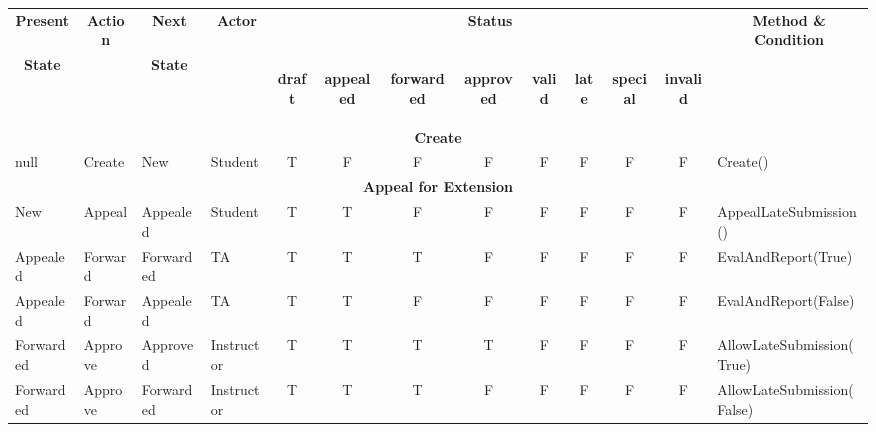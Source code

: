\documentclass{article}
\begin{document}
\begin{enumerate}
\begin{center}
\begin{scriptsize}
\begin{tabular}{|l|l|l|l|c|c|c|c|c|c|c|c|p{4cm}|} \hline
\multicolumn{1}{|c}{\bf Present} &
\multicolumn{1}{|c}{\bf Action} &
\multicolumn{1}{|c}{\bf Next} &
\multicolumn{1}{|c}{\bf Actor} &
\multicolumn{8}{|c}{\bf Status} &
\multicolumn{1}{|c|}{\bf Method \& Condition} \\ \cline{5-12}
\multicolumn{1}{|c}{\bf State} &
\multicolumn{1}{|c}{\bf } &
\multicolumn{1}{|c}{\bf State} &
\multicolumn{1}{|c}{\bf } &
\multicolumn{1}{|c}{\begin{sideways}{\bf draft \quad}\end{sideways}} &
\multicolumn{1}{|c}{\begin{sideways}{\bf appealed \quad}\end{sideways}} &
\multicolumn{1}{|c}{\begin{sideways}{\bf forwarded \quad}\end{sideways}} &
\multicolumn{1}{|c}{\begin{sideways}{\bf approved \quad}\end{sideways}} &
\multicolumn{1}{|c}{\begin{sideways}{\bf valid \quad}\end{sideways}} &
\multicolumn{1}{|c}{\begin{sideways}{\bf late \quad}\end{sideways}} &
\multicolumn{1}{|c}{\begin{sideways}{\bf special \quad}\end{sideways}} &
\multicolumn{1}{|c}{\begin{sideways}{\bf invalid \quad}\end{sideways}} &
\multicolumn{1}{|c|}{\bf } \\ \hline
\multicolumn{13}{|c|}{\bf Create} \\ \hline
null 				& Create 	& \textsf{New} 		& Student	& T	& F & F & F & F & F & F & F & Create() \\ \hline

\multicolumn{13}{|c|}{\bf Appeal for Extension} \\ \hline
\textsf{New} 		& Appeal 	& \textsf{Appealed}	& Student	& T & T & F & F & F & F & F & F & AppealLateSubmission() \\ \hline
\textsf{Appealed} 	& Forward 	& \textsf{Forwarded}& TA		& T & T & T & F & F	& F & F & F & EvalAndReport(True) \\ \hline
\textsf{Appealed} 	& Forward 	& \textsf{Appealed} & TA		& T & T & F & F & F	& F & F & F & EvalAndReport(False) \\ \hline
\textsf{Forwarded} 	& Approve 	& \textsf{Approved} & Instructor& T & T & T & T & F	& F & F & F & AllowLateSubmission(True) \\ \hline
\textsf{Forwarded} 	& Approve 	& \textsf{Forwarded}& Instructor& T & T & T & F & F	& F & F & F & AllowLateSubmission(False) \\ \hline


\end{tabular}
\end{scriptsize}
\end{center}
\end{enumerate}
\end{document}

